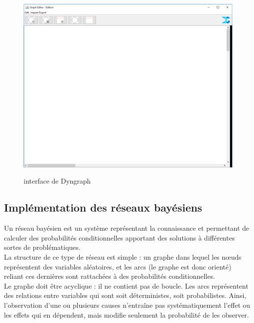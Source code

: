 \documentclass[conference]{IEEEtran}
\begin{document}
\begin{figure}[!h]
\begin{center}
\includegraphics[scale=0.30]{Dyngraph.png}\\
\caption{interface de Dyngraph}
\label{fig 1}
\end{center}
\end{figure}

\subsection{Implémentation des réseaux bayésiens}

Un réseau bayésien est un système représentant la connaissance et permettant de calculer des
probabilités conditionnelles apportant des solutions à différentes sortes de problématiques. \\
La structure de ce type de réseau est simple : un graphe dans lequel les nœuds représentent des
variables aléatoires, et les arcs (le graphe est donc orienté) reliant ces dernières sont rattachées à des
probabilités conditionnelles. \\
Le graphe doit être acyclique : il ne contient pas de boucle. Les arcs représentent des relations
entre variables qui sont soit déterministes, soit probabilistes.
Ainsi, l'observation d'une ou plusieurs causes n'entraîne pas systématiquement l'effet ou les effets qui
en dépendent, mais modifie seulement la probabilité de les observer. \\
\end{document}
